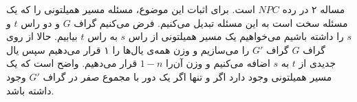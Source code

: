 \documentclass[]{article}
\begin{document}
مساله ۲ در رده $NPC$ است.
برای اثبات این موضوع، مسئله مسیر همیلتونی را که یک مسئله سخت است
به این مسئله تبدیل می‌کنیم.
فرض می‌کنیم گراف $G$ و دو راس $t$ و $s$ را داشته باشیم
می‌خواهیم یک مسیر همیلتونی از راس $s$ به راس $t$ بیابیم.
حالا از روی گراف $G$ گراف $G'$ را می‌سازیم
و وزن همه‌ی یال‌ها را ۱ قرار می‌دهیم سپس یال جدیدی از $t$ به $s$ اضافه می‌کنیم
و وزن آن‌را $1-n$ قرار می‌دهیم.
واضح است که یک مسیر همیلتونی وجود دارد اگر و تنها اگر یک دور با مجموع صفر در
گراف $G'$ وجود داشته باشد.
\end{document}
